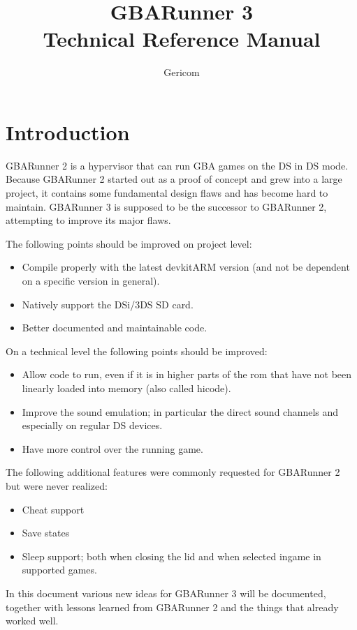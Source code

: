 \documentclass[a4paper,10pt]{report}
\title{GBARunner 3\\Technical Reference Manual}
\author{Gericom}
\begin{document}
\maketitle
\tableofcontents
\chapter{Introduction}
	GBARunner 2 is a hypervisor that can run GBA games on the DS in DS mode. Because GBARunner 2 started out as a proof of concept and grew into a large project, it contains some fundamental design flaws and has become hard to maintain. GBARunner 3 is supposed to be the successor to GBARunner 2, attempting to improve its major flaws.
	
	The following points should be improved on project level:
	\begin{itemize}
		\item Compile properly with the latest devkitARM version (and not be dependent on a specific version in general).
		\item Natively support the DSi/3DS SD card.
		\item Better documented and maintainable code.
	\end{itemize}

	On a technical level the following points should be improved:
	\begin{itemize}
		\item Allow code to run, even if it is in higher parts of the rom that have not been linearly loaded into memory (also called hicode).
		\item Improve the sound emulation; in particular the direct sound channels and especially on regular DS devices.
		\item Have more control over the running game.
	\end{itemize}

	The following additional features were commonly requested for GBARunner 2 but were never realized:
	\begin{itemize}
		\item Cheat support
		\item Save states
		\item Sleep support; both when closing the lid and when selected ingame in supported games.
	\end{itemize}

	In this document various new ideas for GBARunner 3 will be documented, together with lessons learned from GBARunner 2 and the things that already worked well.
\end{document}
